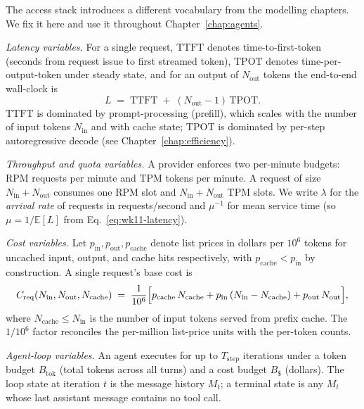 \begin{notationbox}
The access stack introduces a different vocabulary from the
modelling chapters. We fix it here and use it throughout
Chapter~\ref{chap:agents}.

\textit{Latency variables.} For a single request,
$\mathrm{TTFT}$ denotes time-to-first-token (seconds from request
issue to first streamed token), $\mathrm{TPOT}$ denotes
time-per-output-token under steady state, and for an output of
$N_\mathrm{out}$ tokens the end-to-end wall-clock is
\begin{equation}
  L \;=\; \mathrm{TTFT} \;+\; (N_\mathrm{out} - 1)\,\mathrm{TPOT}.
  \label{eq:wk11-latency}
\end{equation}
$\mathrm{TTFT}$ is dominated by prompt-processing (prefill), which
scales with the number of input tokens $N_\mathrm{in}$ and with
cache state; $\mathrm{TPOT}$ is dominated by per-step autoregressive
decode (see Chapter~\ref{chap:efficiency}).

\textit{Throughput and quota variables.} A provider enforces two
per-minute budgets: $\mathrm{RPM}$ requests per minute and
$\mathrm{TPM}$ tokens per minute. A request of size
$N_\mathrm{in} + N_\mathrm{out}$ consumes one RPM slot and
$N_\mathrm{in} + N_\mathrm{out}$ TPM slots. We write $\lambda$ for
the \emph{arrival rate} of requests in requests/second and
$\mu^{-1}$ for mean service time (so $\mu = 1/\mathbb{E}[L]$ from
Eq.~\eqref{eq:wk11-latency}).

\textit{Cost variables.} Let $p_\mathrm{in}, p_\mathrm{out},
p_\mathrm{cache}$ denote list prices in dollars per $10^6$ tokens
for uncached input, output, and cache hits respectively,
with $p_\mathrm{cache} < p_\mathrm{in}$ by construction. A single
request's base cost is
\begin{equation}
  C_\mathrm{req}(N_\mathrm{in}, N_\mathrm{out}, N_\mathrm{cache})
  \;=\; \frac{1}{10^{6}}\Bigl[
        p_\mathrm{cache}\,N_\mathrm{cache}
        + p_\mathrm{in}\,(N_\mathrm{in} - N_\mathrm{cache})
        + p_\mathrm{out}\,N_\mathrm{out}\Bigr],
  \label{eq:wk11-cost}
\end{equation}
where $N_\mathrm{cache} \le N_\mathrm{in}$ is the number of input
tokens served from prefix cache. The $1/10^{6}$ factor reconciles
the per-million list-price units with the per-token counts.

\textit{Agent-loop variables.} An agent executes for up to
$T_\mathrm{step}$ iterations under a token budget
$B_\mathrm{tok}$ (total tokens across all turns) and a cost budget
$B_\${}$ (dollars). The loop state at iteration $t$ is the message
history $M_t$; a terminal state is any $M_t$ whose last assistant
message contains no tool call.


\end{notationbox}
